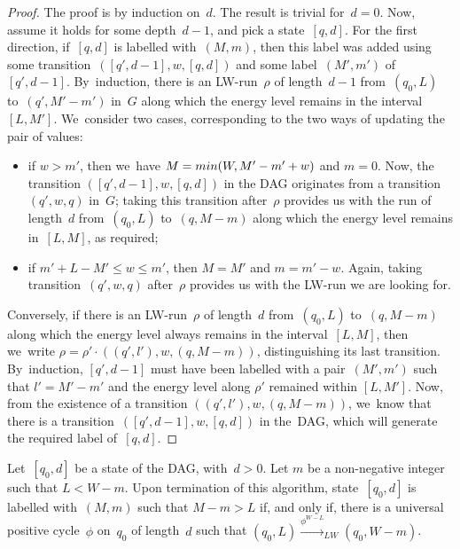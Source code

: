 \begin{proof}
  The proof is by induction on~$d$. The result is trivial for~$d=0$.
  Now, assume it holds for some depth~$d-1$, and pick a
  state~$[q,d]$. For the first direction, if~$[q,d]$ is labelled
  with~$(M,m)$, then this label was added using some
  transition~$([q',d-1],w,[q,d])$ and some label~$(M',m')$
  of~$[q',d-1]$. By~induction, there is an LW-run~$\rho$ of
  length~$d-1$ from~$(q_0,L)$ to~$(q',M'-m')$ in~$G$ along which the
  energy level remains in the interval~$[L,M']$. We~consider two cases,
  corresponding to the two ways of updating the pair of values:
  \begin{itemize}
  \item if $w>m'$, then we~have $M=min(W,M'-m'+w)$ and $m=0$. %
  Now, the transition $([q',d-1],w,[q,d])$ in the DAG originates from a
    transition~$(q',w,q)$ in~$G$; taking this transition after~$\rho$
    provides us with the run of length~$d$ from~$(q_0,L)$ to~$(q,M-m)$
    along which the energy level remains in~$[L,M]$, as required;
  \item if $m'+L-M'\leq w\leq m'$, then $M=M'$ and $m=m'-w$. Again,
    taking transition~$(q',w,q)$ after~$\rho$ provides us with the
    LW-run we are looking for.
  \end{itemize}

  Conversely, if there is an LW-run~$\rho$ of length~$d$
  from~$(q_0,L)$ to~$(q,M-m)$ along which the energy level always
  remains in the interval~$[L,M]$, then we~write $\rho=\rho'\cdot
  ((q',l'),w,(q,M-m))$, distinguishing its last transition. By~induction, $[q',d-1]$ must have been labelled with a pair~$(M',m')$ such that $l'=M'-m'$ and the energy level
  along $\rho'$ remained within $[L,M']$. Now, from the existence of a transition $((q',l'),w,(q,M-m))$, we~know that there is a
  transition~$([q',d-1],w,[q,d])$ in the~DAG, which will generate the required label of~$[q,d]$.
\end{proof}

  Let~$[q_0,d]$ be a state of the DAG, with~$d>0$. Let $m$ be a
  non-negative integer such that $L<W-m$.  Upon termination of this algorithm, state~$[q_0,d]$ is labelled with~$(M,m)$ such that $M-m>L$ if, and only if, there is a universal  positive cycle~$\phi$ on~$q_0$ of length~$d$ such that $(q_0,L) \xrightarrow{\phi^{W-L}}_{LW} (q_0,W-m)$.


